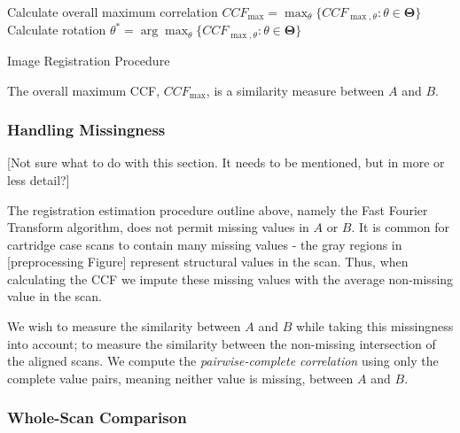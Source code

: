 \documentclass[
]{jdssv}
\begin{document}
\begin{algorithm}[htbp]
 Calculate overall maximum correlation $CCF_{\max} = \max_{\theta} \{CCF_{\max,\theta} : \theta \in \pmb{\Theta}\}$\;
 Calculate rotation $\theta^* = \arg \max_{\theta} \{CCF_{\max,\theta} : \theta \in \pmb{\Theta}\}$\;
 \caption{Image Registration Procedure}
 \label{alg:registration}
\end{algorithm}

The overall maximum CCF, \(CCF_{\max}\), is a similarity measure between
\(A\) and \(B\).

\hypertarget{handling-missingness}{%
\subsubsection{Handling Missingness}\label{handling-missingness}}

{[}Not sure what to do with this section. It needs to be mentioned, but
in more or less detail?{]}

The registration estimation procedure outline above, namely the Fast
Fourier Transform algorithm, does not permit missing values in \(A\) or
\(B\). It is common for cartridge case scans to contain many missing
values - the gray regions in {[}preprocessing Figure{]} represent
structural values in the scan. Thus, when calculating the CCF we impute
these missing values with the average non-missing value in the scan.

We wish to measure the similarity between \(A\) and \(B\) while taking
this missingness into account; to measure the similarity between the
non-missing intersection of the aligned scans. We compute the
\emph{pairwise-complete correlation} using only the complete value
pairs, meaning neither value is missing, between \(A\) and \(B\).

\hypertarget{whole-scan-comparison}{%
\subsubsection{Whole-Scan Comparison}\label{whole-scan-comparison}}
\end{document}
